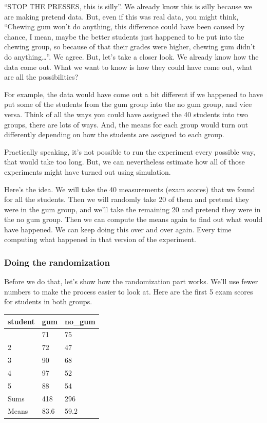 \documentclass[
  letterpaper,
  DIV=11,
  numbers=noendperiod]{scrreprt}
\begin{document}
``STOP THE PRESSES, this is silly''. We already know this is silly
because we are making pretend data. But, even if this was real data, you
might think, ``Chewing gum won't do anything, this difference could have
been caused by chance, I mean, maybe the better students just happened
to be put into the chewing group, so because of that their grades were
higher, chewing gum didn't do anything\ldots{}''. We agree. But, let's
take a closer look. We already know how the data come out. What we want
to know is how they could have come out, what are all the possibilities?

For example, the data would have come out a bit different if we happened
to have put some of the students from the gum group into the no gum
group, and vice versa. Think of all the ways you could have assigned the
40 students into two groups, there are lots of ways. And, the means for
each group would turn out differently depending on how the students are
assigned to each group.

Practically speaking, it's not possible to run the experiment every
possible way, that would take too long. But, we can nevertheless
estimate how all of those experiments might have turned out using
simulation.

Here's the idea. We will take the 40 measurements (exam scores) that we
found for all the students. Then we will randomly take 20 of them and
pretend they were in the gum group, and we'll take the remaining 20 and
pretend they were in the no gum group. Then we can compute the means
again to find out what would have happened. We can keep doing this over
and over again. Every time computing what happened in that version of
the experiment.

\subsubsection{Doing the randomization}\label{doing-the-randomization}

Before we do that, let's show how the randomization part works. We'll
use fewer numbers to make the process easier to look at. Here are the
first 5 exam scores for students in both groups.

\begin{longtable}[]{@{}lll@{}}
\toprule\noalign{}
student & gum & no\_gum \\
\midrule\noalign{}
\endhead
\bottomrule\noalign{}
\endlastfoot
1 & 71 & 75 \\
2 & 72 & 47 \\
3 & 90 & 68 \\
4 & 97 & 52 \\
5 & 88 & 54 \\
Sums & 418 & 296 \\
Means & 83.6 & 59.2 \\
\end{longtable}
\end{document}
